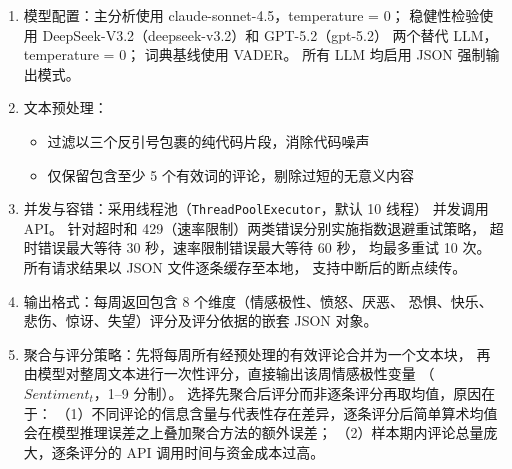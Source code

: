 \documentclass[
    type = master, %
    degree = professional,        %
    decl-page,  %
    twoside,                %
    fontset = fandol %
  ]{njuthesis}
\begin{document}
\begin{enumerate}
  \item 模型配置：主分析使用 claude-sonnet-4.5，temperature = 0；
        稳健性检验使用 DeepSeek-V3.2（deepseek-v3.2）和 GPT-5.2（gpt-5.2）
        两个替代 LLM，temperature = 0；
        词典基线使用 VADER\cite{hutto2014vader}。
        所有 LLM 均启用 JSON 强制输出模式。
  \item 文本预处理：
    \begin{itemize}
      \item 过滤以三个反引号包裹的纯代码片段，消除代码噪声
      \item 仅保留包含至少 5 个有效词的评论，剔除过短的无意义内容
    \end{itemize}
  \item 并发与容错：采用线程池（\texttt{ThreadPoolExecutor}，默认 10 线程）
        并发调用 API。
        针对超时和 429（速率限制）两类错误分别实施指数退避重试策略，
        超时错误最大等待 30 秒，速率限制错误最大等待 60 秒，
        均最多重试 10 次。所有请求结果以 JSON 文件逐条缓存至本地，
        支持中断后的断点续传。
  \item 输出格式：每周返回包含 8 个维度（情感极性、愤怒、厌恶、
        恐惧、快乐、悲伤、惊讶、失望）评分及评分依据的嵌套 JSON 对象。
  \item 聚合与评分策略：先将每周所有经预处理的有效评论合并为一个文本块，
        再由模型对整周文本进行一次性评分，直接输出该周情感极性变量
        （$\mathit{Sentiment}_t$，1--9 分制）。
        选择先聚合后评分而非逐条评分再取均值，原因在于：
        （1）不同评论的信息含量与代表性存在差异，逐条评分后简单算术均值
        会在模型推理误差之上叠加聚合方法的额外误差；
        （2）样本期内评论总量庞大，逐条评分的 API 调用时间与资金成本过高。
\end{enumerate}
\end{document}
